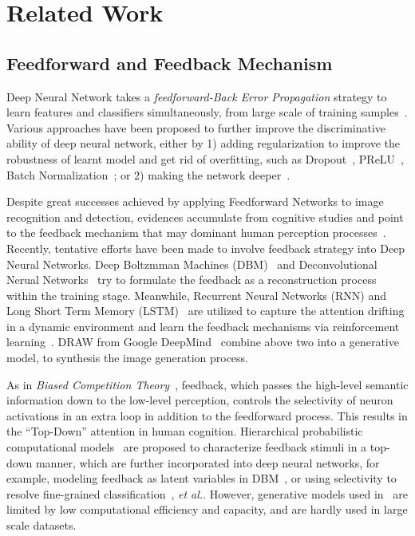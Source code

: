 \section{Related Work}
\label{sec:related_work}

\subsection{Feedforward and Feedback Mechanism}
Deep Neural Network takes a \emph{feedforward-Back Error Propagation} strategy to learn features and classifiers simultaneously, from large scale of training samples~\cite{Krizhevsky2012ImageNet,Simonyan2014Very,lin2013network,salakhutdinov2009deep,bengio2013representation}. Various approaches have been proposed to further improve the discriminative ability of deep neural network, either by 1) adding regularization to improve the robustness of learnt model and get rid of overfitting, such as Dropout~\cite{srivastava2014dropout}, PReLU~\cite{he2015delving}, Batch Normalization~\cite{ioffe2015batch}; or 2) making the network deeper~\cite{Szegedy2014Going,Simonyan2014Very}.

Despite great successes achieved by applying Feedforward Networks to image recognition and detection, evidences accumulate from cognitive studies and point to the feedback mechanism that may dominant human perception processes~\cite{Cichy2014Resolving,Rust:2010if,Kruger2013Deep,lee2003hierarchical}. Recently, tentative efforts have been made to involve feedback strategy into Deep Neural Networks. Deep Boltzmman Machines (DBM)~\cite{salakhutdinov2009deep,sohn2013learning} and Deconvolutional Nerual Networks~\cite{Zeiler:2011hy} try to formulate the feedback as a reconstruction process within the training stage. Meanwhile, Recurrent Neural Networks (RNN) and Long Short Term Memory (LSTM)~\cite{hochreiter1997long} are utilized to capture the attention drifting in a dynamic environment and learn the feedback mechanisms via reinforcement learning~\cite{Stollenga:2014tl,Mnih:2014ti}. DRAW from Google DeepMind~\cite{gregor2015draw} combine above two into a generative model, to synthesis the image generation process.

As in \emph{Biased Competition Theory}~\cite{beck2009top,desimone1995neural}, feedback, which passes the high-level semantic information down to the low-level perception, controls the selectivity of neuron activations in an extra loop in addition to the feedforward process. This results in the ``Top-Down'' attention in human cognition. Hierarchical probabilistic computational models~\cite{lee2003hierarchical} are proposed to characterize feedback stimuli in a top-down manner, which are further incorporated into deep neural networks, for example, modeling feedback as latent variables in DBM~\cite{wang2014attentional}, or using selectivity to resolve fine-grained classification~\cite{Mnih:2014ti}, \emph{et al.}. However, generative models used in~\cite{Mnih:2014ti,wang2014attentional} are limited by low computational efficiency and capacity, and are hardly used in large scale datasets.

